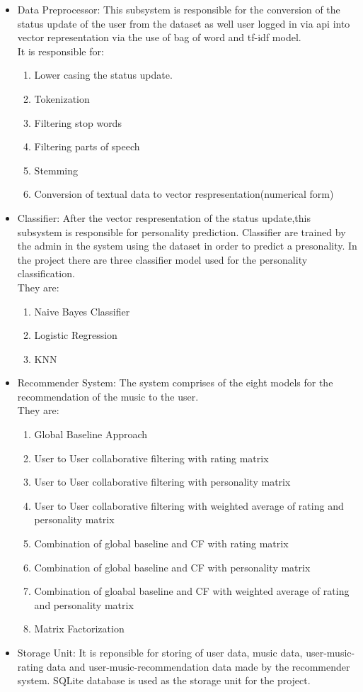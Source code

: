 \begin{itemize}
	\item Data Preprocessor: This subsystem is responsible for the conversion of the status update of the user from the dataset \cite{dataset} as well user logged in via api \cite{api} into vector representation via the use of bag of word and tf-idf model.\\
It is responsible for:
		\begin{enumerate}
			\item Lower casing the status update.
			\item Tokenization
			\item Filtering stop words
			\item Filtering parts of speech
			\item Stemming
			\item Conversion of textual data to vector respresentation(numerical form)
		\end{enumerate}
	\item Classifier: After the vector respresentation of the status update,this subsystem is responsible for personality prediction. Classifier are trained by the admin in the system using the dataset \cite{dataset} in order to predict a presonality. In the project there are three classifier model used for the personality classification.\\
They are:
\begin{enumerate}
	\item Naive Bayes Classifier
	\item Logistic Regression
	\item KNN 
\end{enumerate}
\item Recommender System: The system comprises of the eight models for the recommendation of the music to the user.\\
They are:
\begin{enumerate}
	\item Global Baseline Approach
	\item User to User collaborative filtering with rating matrix
	\item User to User collaborative filtering with personality matrix
	\item User to User collaborative filtering with weighted average of rating and personality matrix
	\item Combination of global baseline and CF with rating matrix
	\item Combination of global baseline and CF with personality matrix
	\item Combination of gloabal baseline and CF with weighted average of rating and personality matrix
	\item Matrix Factorization
\end{enumerate}
\item Storage Unit: It is reponsible for storing of user data, music data, user-music-rating data and user-music-recommendation data made by the recommender system. SQLite database is used as the storage unit for the project.
\end{itemize}

